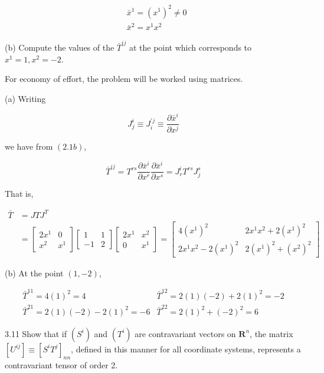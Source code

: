 \documentclass[10pt]{article}
\begin{document}
$$
\begin{aligned}
& \bar{x}^{1}=\left(x^{1}\right)^{2} \neq 0 \\
& \bar{x}^{2}=x^{1} x^{2}
\end{aligned}
$$

(b) Compute the values of the $\bar{T}^{i j}$ at the point which corresponds to $x^{1}=1, x^{2}=-2$.

For economy of effort, the problem will be worked using matrices.

(a) Writing

$$
J_{j}^{i} \equiv J_{i}^{\prime j} \equiv \frac{\partial \bar{x}^{i}}{\partial x^{j}}
$$

we have from $(2.1 b)$,

$$
\bar{T}^{i j}=T^{r s} \frac{\partial \bar{x}^{i}}{\partial x^{r}} \frac{\partial \bar{x}^{i}}{\partial x^{s}}=J_{r}^{i} T^{r s} J_{j}^{s}
$$

That is,

$$
\begin{aligned}
\bar{T} & =J T J^{T} \\
& =\left[\begin{array}{cc}
2 x^{1} & 0 \\
x^{2} & x^{1}
\end{array}\right]\left[\begin{array}{rr}
1 & 1 \\
-1 & 2
\end{array}\right]\left[\begin{array}{cc}
2 x^{1} & x^{2} \\
0 & x^{1}
\end{array}\right]=\left[\begin{array}{cc}
4\left(x^{1}\right)^{2} & 2 x^{1} x^{2}+2\left(x^{1}\right)^{2} \\
2 x^{1} x^{2}-2\left(x^{1}\right)^{2} & 2\left(x^{1}\right)^{2}+\left(x^{2}\right)^{2}
\end{array}\right]
\end{aligned}
$$

(b) At the point $(1,-2)$,

$$
\begin{array}{ll}
\bar{T}^{11}=4(1)^{2}=4 & \bar{T}^{12}=2(1)(-2)+2(1)^{2}=-2 \\
\bar{T}^{21}=2(1)(-2)-2(1)^{2}=-6 & \bar{T}^{22}=2(1)^{2}+(-2)^{2}=6
\end{array}
$$

3.11 Show that if $\left(S^{i}\right)$ and $\left(T^{i}\right)$ are contravariant vectors on $\mathbf{R}^{n}$, the matrix $\left[U^{i j}\right] \equiv\left[S^{i} T^{j}\right]_{n n}$, defined in this manner for all coordinate systems, represents a contravariant tensor of order 2.
\end{document}
